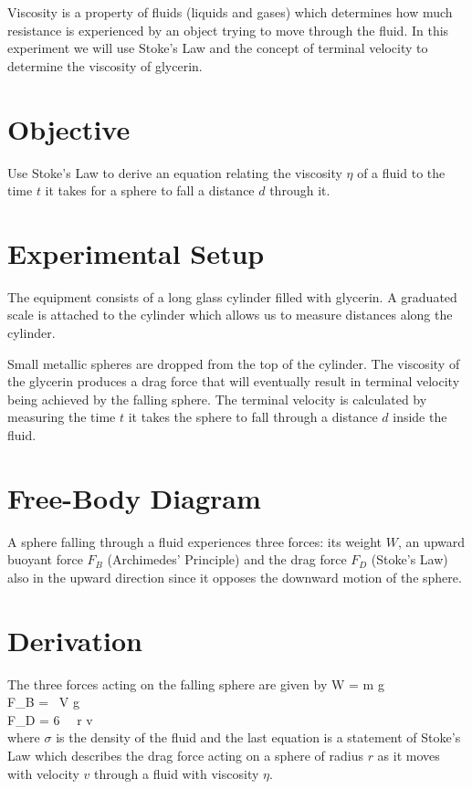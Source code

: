 Viscosity is a property of fluids (liquids and gases) which determines how much resistance is experienced by an object trying to move through the fluid. In this experiment we will use Stoke's Law and the concept of terminal velocity to determine the viscosity of glycerin.

\section*{Objective}

   Use Stoke's Law to derive an equation relating the viscosity $\eta$ of a fluid to the time $t$ it takes for a sphere to fall a distance $d$ through it.

\section*{Experimental Setup}

   The equipment consists of a long glass cylinder filled with glycerin. A graduated scale is attached to the cylinder which allows us to measure distances along the cylinder.
   
   Small metallic spheres are dropped from the top of the cylinder. The viscosity of the glycerin produces a drag force that will eventually result in terminal velocity being achieved by the falling sphere. The terminal velocity is calculated by measuring the time $t$ it takes the sphere to fall through a distance $d$ inside the fluid.

   \diag

\section*{Free-Body Diagram}

   A sphere falling through a fluid experiences three forces: its weight $W$, an upward buoyant force $F_B$ (Archimedes' Principle) and the drag force $F_D$ (Stoke's Law) also in the upward direction since it opposes the downward motion of the sphere.

   

\section*{Derivation}

   The three forces acting on the falling sphere are given by
   \beqc \label{three_forces}
      W = m g\\
      F_B = \sigma \, V g\\
      F_D = 6 \pi \, \eta \, r v\\
   \eeqc
   where $\sigma$ is the density of the fluid and the last equation is a statement of Stoke's Law which describes the drag force acting on a sphere of radius $r$ as it moves with velocity $v$ through a fluid with viscosity $\eta$.

